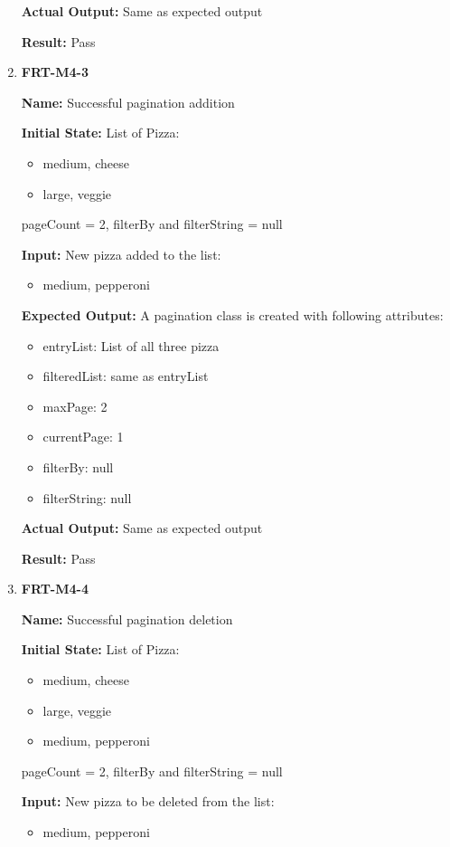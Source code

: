 \documentclass[12pt, titlepage]{article}
\begin{document}
\begin{enumerate}
\textbf{Actual Output:} Same as expected output

\textbf{Result:} Pass

\item \textbf{FRT-M4-3}

\textbf{Name:} Successful pagination addition

\textbf{Initial State:} List of Pizza:
\begin{itemize}
\item medium, cheese
\item large, veggie
\end{itemize}
pageCount = 2, filterBy and filterString = null

\textbf{Input:} New pizza added to the list:
\begin{itemize}
\item medium, pepperoni
\end{itemize}

\textbf{Expected Output:} A pagination class is created with following attributes:
\begin{itemize}
\item entryList: List of all three pizza
\item filteredList: same as entryList
\item maxPage: 2
\item currentPage: 1
\item filterBy: null
\item filterString: null
\end{itemize}

\textbf{Actual Output:} Same as expected output

\textbf{Result:} Pass

\item \textbf{FRT-M4-4}

\textbf{Name:} Successful pagination deletion

\textbf{Initial State:} List of Pizza:
\begin{itemize}
\item medium, cheese
\item large, veggie
\item medium, pepperoni
\end{itemize}
pageCount = 2, filterBy and filterString = null
					
\textbf{Input:} New pizza to be deleted from the list:
\begin{itemize}
\item medium, pepperoni
\end{itemize}


\end{enumerate}
\end{document}
